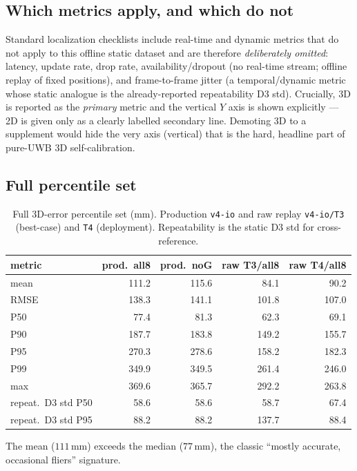 \documentclass[11pt,a4paper]{article}
\newcommand{\mm}{\,\si{\milli\meter}}
\begin{document}
\subsection{Which metrics apply, and which do not}
Standard localization checklists include real-time and dynamic metrics that do not apply to
this offline static dataset and are therefore \emph{deliberately omitted}: latency, update
rate, drop rate, availability/dropout (no real-time stream; offline replay of fixed
positions), and frame-to-frame jitter (a temporal/dynamic metric whose static analogue is
the already-reported repeatability D3 std). Crucially, 3D is reported as the \emph{primary}
metric and the vertical $Y$ axis is shown explicitly --- 2D is given only as a clearly
labelled secondary line. Demoting 3D to a supplement would hide the very axis (vertical) that
is the hard, headline part of pure-UWB 3D self-calibration.

\subsection{Full percentile set}
\begin{table}[h]
\centering
\caption{Full 3D-error percentile set (\si{\milli\meter}). Production \texttt{v4-io} and raw
replay \texttt{v4-io/T3} (best-case) and \texttt{T4} (deployment). Repeatability is the
static D3 std for cross-reference.}
\begin{tabular}{lrrrr}
\toprule
metric & prod.\ all8 & prod.\ noG & raw T3/all8 & raw T4/all8 \\
\midrule
mean        & 111.2 & 115.6 & 84.1  & 90.2  \\
RMSE        & 138.3 & 141.1 & 101.8 & 107.0 \\
P50         & 77.4  & 81.3  & 62.3  & 69.1  \\
P90         & 187.7 & 183.8 & 149.2 & 155.7 \\
P95         & 270.3 & 278.6 & 158.2 & 182.3 \\
P99         & 349.9 & 349.5 & 261.4 & 246.0 \\
max         & 369.6 & 365.7 & 292.2 & 263.8 \\
\midrule
repeat.\ D3 std P50 & 58.6 & 58.6 & 58.7  & 67.4 \\
repeat.\ D3 std P95 & 88.2 & 88.2 & 137.7 & 88.4 \\
\bottomrule
\end{tabular}
\end{table}

\noindent
The mean ($111\mm$) exceeds the median ($77\mm$), the classic ``mostly accurate, occasional
fliers'' signature.
\end{document}
